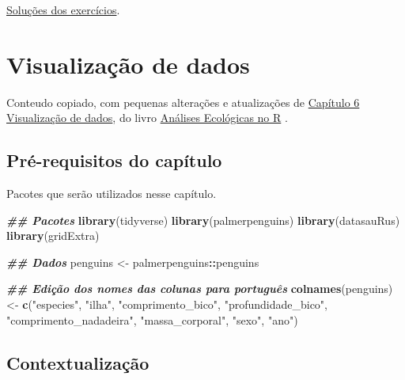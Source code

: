 \documentclass[
]{article}
\newenvironment{Shaded}{\begin{snugshade}}{\end{snugshade}}
\newcommand{\DocumentationTok}[1]{\textcolor[rgb]{0.56,0.35,0.01}{\textbf{\textit{#1}}}}
\newcommand{\FunctionTok}[1]{\textcolor[rgb]{0.13,0.29,0.53}{\textbf{#1}}}
\newcommand{\NormalTok}[1]{#1}
\newcommand{\OtherTok}[1]{\textcolor[rgb]{0.56,0.35,0.01}{#1}}
\newcommand{\SpecialCharTok}[1]{\textcolor[rgb]{0.81,0.36,0.00}{\textbf{#1}}}
\newcommand{\StringTok}[1]{\textcolor[rgb]{0.31,0.60,0.02}{#1}}
\begin{document}
\href{https://exercicios-livro-aer.netlify.app/cap.-5---tidyverse.html}{Soluções dos exercícios}.

\newpage{}

\hypertarget{cap23}{%
\section{Visualização de dados}\label{cap23}}

Conteudo copiado, com pequenas alterações e atualizações de \href{https://analises-ecologicas.com/cap6}{Capítulo 6 Visualização de dados}, do livro \href{https://analises-ecologicas.com/}{Análises Ecológicas no R} .

\hypertarget{pruxe9-requisitos-do-capuxedtulo-2}{%
\subsection*{Pré-requisitos do capítulo}\label{pruxe9-requisitos-do-capuxedtulo-2}}

Pacotes que serão utilizados nesse capítulo.

\begin{Shaded}
\begin{Highlighting}[]
\DocumentationTok{\#\# Pacotes}
\FunctionTok{library}\NormalTok{(tidyverse)}
\FunctionTok{library}\NormalTok{(palmerpenguins)}
\FunctionTok{library}\NormalTok{(datasauRus)}
\FunctionTok{library}\NormalTok{(gridExtra)}

\DocumentationTok{\#\# Dados}
\NormalTok{penguins }\OtherTok{\textless{}{-}}\NormalTok{ palmerpenguins}\SpecialCharTok{::}\NormalTok{penguins}

\DocumentationTok{\#\# Edição dos nomes das colunas para português }
\FunctionTok{colnames}\NormalTok{(penguins) }\OtherTok{\textless{}{-}} \FunctionTok{c}\NormalTok{(}\StringTok{"especies"}\NormalTok{, }\StringTok{"ilha"}\NormalTok{, }\StringTok{"comprimento\_bico"}\NormalTok{, }
                        \StringTok{"profundidade\_bico"}\NormalTok{, }\StringTok{"comprimento\_nadadeira"}\NormalTok{, }
                        \StringTok{"massa\_corporal"}\NormalTok{, }\StringTok{"sexo"}\NormalTok{, }\StringTok{"ano"}\NormalTok{)}
\end{Highlighting}
\end{Shaded}

\hypertarget{contextualizauxe7uxe3o-2}{%
\subsection{Contextualização}\label{contextualizauxe7uxe3o-2}}
\end{document}
